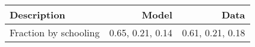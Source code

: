 \begin{tabular}{lrr}
\hline
Description & Model  & Data  \\ 
\hline
Fraction by schooling & 0.65, 0.21, 0.14  & 0.61, 0.21, 0.18  \\ 
\hline
\end{tabular}%
